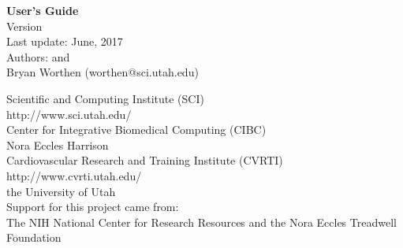   \mbox{}
  \vspace{2in}
\begin{center}
   {\huge\bf \map{} User's Guide}\\
   \vspace{.5in}
   {\Large Version \version{}\\
   \medskip
   Last update: June, 2017 \\}
   \bigskip
   {\Large Authors: \rob{} and \\
   Bryan Worthen (worthen@sci.utah.edu)
   }
   \bigskip

   {\Large 
   \medskip
   Scientific and Computing Institute (SCI)\\
   {http://www.sci.utah.edu/}\\
   \medskip
   Center for Integrative Biomedical Computing (CIBC)
   \\
   \medskip
   Nora Eccles Harrison \\
   Cardiovascular Research and Training Institute (CVRTI)\\
   {http://www.cvrti.utah.edu/}\\
   \medskip
   the University of Utah}\\

   \bigskip
   Support for this project came from:\\
   \medskip
   {\Large The NIH National Center for Research Resources  
    and the Nora
   Eccles Treadwell Foundation\\ 
   \smallskip
   }

\end{center}

